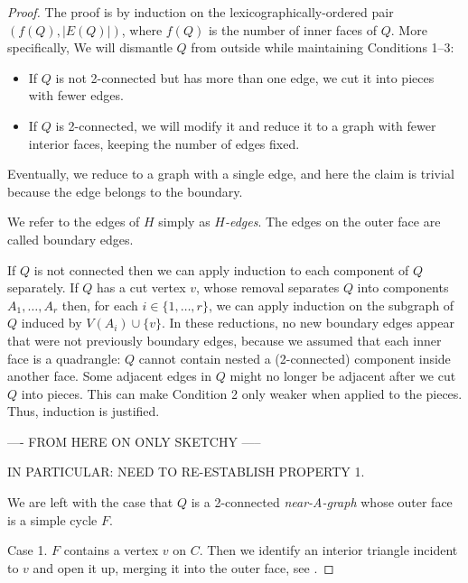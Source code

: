 \begin{proof}
The proof is by induction
   on the lexicographically-ordered pair $(f(Q),|E(Q)|)$, where $f(Q)$
is the number of inner faces of $Q$. 
More specifically, %
We will dismantle $Q$
 from outside while maintaining
 Conditions 1--3:
\begin{itemize}
\item If $Q$ is not 2-connected but has more than one edge, we cut it
  into pieces with fewer edges.
\item If $Q$ is 2-connected, we will modify it and reduce it to a
  graph
with fewer interior faces,
keeping the number of edges fixed.
\end{itemize}
Eventually, we reduce to a graph with a single edge, and here the
claim is trivial because the edge belongs to the boundary.

   We refer to the edges of $H$ simply as \emph{$H$-edges}.
The edges on the outer
   face are called boundary edges.

If $Q$ is not connected then we can apply induction to each component
   of $Q$ separately. If $Q$ has a cut vertex $v$, whose removal
   separates $Q$ into components $A_1,\ldots,A_r$ then, for each
   $i\in\{1,\ldots,r\}$, we can apply induction on the subgraph of $Q$
   induced by $V(A_i)\cup\{v\}$.  
In these reductions, no new boundary edges appear that were not
previously boundary edges, because we assumed that each inner face is
a quadrangle: $Q$ cannot contain nested a (2-connected) component
inside another face.
Some adjacent edges in $Q$ might no longer be adjacent
after we cut $Q$ into pieces. This can make Condition 2 only weaker
when applied to the pieces. Thus, induction is justified.

----  FROM HERE ON ONLY SKETCHY -----

IN PARTICULAR: NEED TO RE-ESTABLISH PROPERTY 1.

We are left with the case that $Q$ is a 2-connected \emph{near-A-graph} whose outer face 
   is a simple cycle $F$.

Case 1. $F$ contains a vertex $v$ on $C$.
Then we identify an interior triangle incident to $v$ and open it up,
merging it into the outer face, see .


\end{proof}
